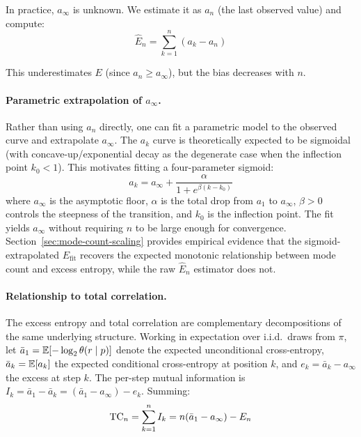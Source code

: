 In practice, $a_\infty$ is unknown.
We estimate it as $a_n$ (the last observed value) and compute:
\begin{equation}\label{eq:excess-hat}
    \hat{E}_n = \sum_{k=1}^{n}(a_k - a_n)
\end{equation}

This underestimates $E$ (since $a_n \geq a_\infty$), but the bias decreases with $n$.

\paragraph{Parametric extrapolation of $a_\infty$.} Rather than using $a_n$ directly, one can fit a parametric model to the observed curve and extrapolate $a_\infty$.
The $a_k$ curve is theoretically expected to be sigmoidal (with concave-up/exponential decay as the degenerate case when the inflection point $k_0 < 1$).
This motivates fitting a four-parameter sigmoid:
\begin{equation}\label{eq:sigmoid-fit}
    a_k = a_\infty + \frac{\alpha}{1 + e^{\beta(k - k_0)}}
\end{equation}
where $a_\infty$ is the asymptotic floor, $\alpha$ is the total drop from $a_1$ to $a_\infty$, $\beta > 0$ controls the steepness of the transition, and $k_0$ is the inflection point.
The fit yields $a_\infty$ without requiring $n$ to be large enough for convergence.
Section~\ref{sec:mode-count-scaling} provides empirical evidence that the sigmoid-extrapolated $E_{\mathrm{fit}}$ recovers the expected monotonic relationship between mode count and excess entropy, while the raw $\hat{E}_n$ estimator does not.

\paragraph{Relationship to total correlation.} The excess entropy and total correlation are complementary decompositions of the same underlying structure.
Working in expectation over i.i.d.\ draws from $\pi$, let $\bar{a}_1 = \mathbb{E}[-\log_2 \theta(r \mid p)]$ denote the expected unconditional cross-entropy, $\bar{a}_k = \mathbb{E}[a_k]$ the expected conditional cross-entropy at position $k$, and $e_k = \bar{a}_k - a_\infty$ the excess at step $k$.
The per-step mutual information is $I_k = \bar{a}_1 - \bar{a}_k = (\bar{a}_1 - a_\infty) - e_k$.
Summing:
\begin{equation}\label{eq:tc-decomp}
    \mathrm{TC}_n = \sum_{k=1}^{n} I_k = n(\bar{a}_1 - a_\infty) - E_n
\end{equation}

